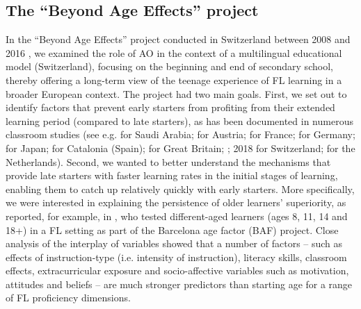 \documentclass[output=paper,modfonts,nonflat,newtxmath]{langsci/langscibook}
\begin{document}
\subsection{{The} {“Beyond} {Age} {Effects”} {project}}
\label{sec:pfenninger:2.1.}

In the “Beyond Age Effects” project conducted in Switzerland between 2008 and 2016 \citep{Pfenninger2017}, we examined the role of AO in the context of a multilingual educational model (Switzerland), focusing on the beginning and end of secondary school, thereby offering a long-term view of the teenage experience of FL learning in a broader European context. The project had two main goals. First, we set out to identify factors that prevent early starters from profiting from their extended learning period (compared to late starters), as has been documented in numerous classroom studies (see e.g. \citealt{Al-Thubaiti2010} for Saudi Arabia; \citealt{Buchholz2007} for Austria; \citealt{Genelot1997} for France; \citealt{JaekelEtAl2017} for Germany; \citealt{Larson-Hall2008} for Japan; \citealt{Muñoz2006} for Catalonia (Spain); \citealt{GrahamEtAl2017} for Great Britain; \citealt{Pfenninger2017}; 2018 for Switzerland; \citealt{UnsworthEtAl2015} for the Netherlands). Second, we wanted to better understand the mechanisms that provide late starters with faster learning rates in the initial stages of learning, enabling them to catch up relatively quickly with early starters. More specifically, we were interested in explaining the persistence of older learners’ superiority, as reported, for example, in \citet{Muñoz2006}, who tested different-aged learners (ages 8, 11, 14 and 18+) in a FL setting as part of the Barcelona age factor (BAF) project. Close analysis of the interplay of variables showed that a number of factors – such as effects of instruction-type (i.e. intensity of instruction), literacy skills, classroom effects, extracurricular exposure and socio-affective variables such as motivation, attitudes and beliefs – are much stronger predictors than starting age for a range of FL proficiency dimensions.
\end{document}
